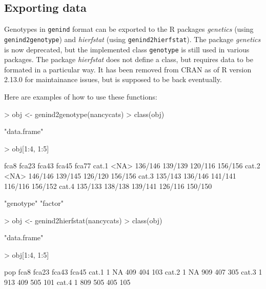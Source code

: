 \documentclass{article}
\begin{document}
\subsection{Exporting data}
Genotypes in \texttt{genind} format can be exported to the R packages
\emph{genetics} (using \texttt{genind2genotype}) and \emph{hierfstat} (using \texttt{genind2hierfstat}).
The package \emph{genetics} is now deprecated, but the implemented
class \texttt{genotype} is still used in various packages.
The package \emph{hierfstat} does not define a class, but requires
data to be formated in a particular way.
It has been removed from CRAN as of R version 2.13.0 for maintainance issues, but is supposed to be
back eventually.

Here are examples of how to use these functions:
\begin{Schunk}
\begin{Sinput}
> obj <- genind2genotype(nancycats)
> class(obj)
\end{Sinput}
\begin{Soutput}
[1] "data.frame"
\end{Soutput}
\begin{Sinput}
> obj[1:4, 1:5]
\end{Sinput}
\begin{Soutput}
         fca8   fca23   fca43   fca45   fca77
cat.1    <NA> 136/146 139/139 120/116 156/156
cat.2    <NA> 146/146 139/145 126/120 156/156
cat.3 135/143 136/146 141/141 116/116 156/152
cat.4 135/133 138/138 139/141 126/116 150/150
\end{Soutput}
\begin{Soutput}
[1] "genotype" "factor"  
\end{Soutput}
\end{Schunk}

\begin{Schunk}
\begin{Sinput}
> obj <- genind2hierfstat(nancycats)
> class(obj)
\end{Sinput}
\begin{Soutput}
[1] "data.frame"
\end{Soutput}
\begin{Sinput}
> obj[1:4, 1:5]
\end{Sinput}
\begin{Soutput}
      pop fca8 fca23 fca43 fca45
cat.1   1   NA   409   404   103
cat.2   1   NA   909   407   305
cat.3   1  913   409   505   101
cat.4   1  809   505   405   105
\end{Soutput}
\end{Schunk}
\end{document}
